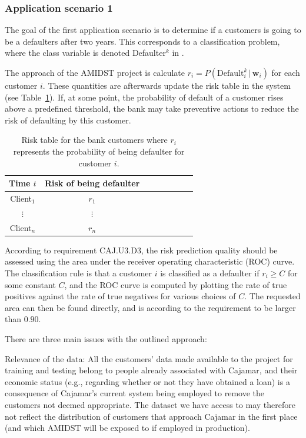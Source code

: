 \documentclass{article}
\theoremstyle{theorem}
\theoremstyle{definition}
\newcommand{\w}{\mathbf{w}}
\begin{document}
\subsubsection{Application scenario 1}

The goal of the first application scenario is to determine if a customers is going to be a defaulters after two years. This corresponds to a classification problem, where the class variable is denoted Defaulter$^k$ in . 

The approach of the AMIDST project is calculate $r_i=P(\mbox{Default}_i^k \,|\, \w_i)$ for each customer $i$. These quantities are afterwards update the risk table in the system (see Table~\ref{tab:riskTable}).
If, at some point, the probability of default of a customer rises above a predefined threshold, the bank may take preventive actions to reduce the risk of defaulting by this customer.

\begin{table}[ht!]
\centering
\begin{tabular}{c|ccc|ccc|c}
     Time $t$  & Risk of being defaulter \\  
\hline
Client$_1$  &    $r_1$  \\ 
$\vdots$      &   $\vdots$   \\ 
Client$_n$  &   $r_n$  \\ 
\end{tabular} 
\caption{Risk table for the bank customers where $r_i$ represents the probability of being defaulter for customer $i$.}
\label{tab:riskTable}
\end{table}



According to requirement CAJ.U3.D3, the risk prediction quality should be assessed using the area under the receiver operating characteristic (ROC) curve. 
The classification rule is that a customer $i$ is classified as a defaulter if $r_i \geq C$ for some constant $C$, and the ROC curve is computed by  plotting the rate of true positives against the rate of true negatives for various choices of $C$.  The requested area can then be found directly, and is according to the requirement to be larger than $0.90$. 

There are three main issues with the outlined approach:
\bde
\item[Relevance of the data:]  All the customers' data made available to the project for training and testing belong to people already associated with Cajamar, and their economic status (e.g., regarding whether or not they have obtained a loan) is a consequence of Cajamar's current system being employed to remove the customers not deemed appropriate. The dataset we have access to may therefore not reflect the distribution of customers that approach Cajamar in the first place (and which AMIDST will be exposed to if employed in production).
\end{document}
